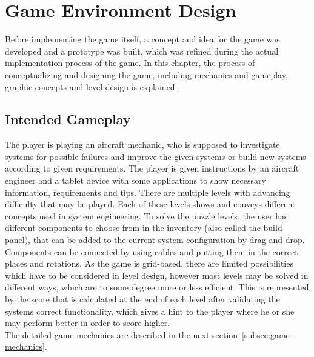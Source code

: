 \section{Game Environment Design}\label{sec:game-environment-design}
Before implementing the game itself, a concept and idea for the game was developed and a prototype was built, which was refined during the
actual implementation process of the game.
In this chapter, the process of conceptualizing and designing the game, including mechanics and gameplay, graphic concepts and
level design is explained.

\subsection{Intended Gameplay}\label{subsec:intended-gameplay}
The player is playing an aircraft mechanic, who is supposed to investigate systems for possible failures and improve the given systems or
build new systems according to given requirements.
The player is given instructions by an aircraft engineer and a tablet device with some applications to show necessary
information, requirements and tips.
There are multiple levels with advancing difficulty that may be played.
Each of these levels shows and conveys different concepts used in system engineering.
To solve the puzzle levels, the user has different components to choose from in the inventory (also called the build panel), that
can be added to the current system configuration by drag and drop.
Components can be connected by using cables and putting them in the correct places and rotations.
As the game is grid-based, there are limited possibilities which have to be considered in level design, however most levels
may be solved in different ways, which are to some degree more or less efficient.
This is represented by the score that is calculated at the end of each level after validating the systems correct functionality, which gives
a hint to the player where he or she may perform better in order to score higher.
\\
The detailed game mechanics are described in the next section~\ref{subsec:game-mechanics}.

